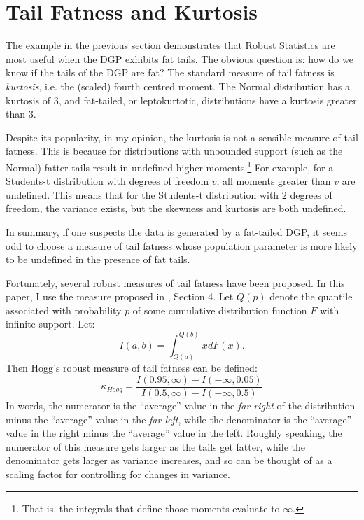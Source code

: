 \documentclass[12pt,a4paper]{amsart}
\renewcommand{\k}{\kappa}
\newcommand{\can}{\citeasnoun}							%
\begin{document}
\section{Tail Fatness and Kurtosis}\label{secTailFatness}

The example in the previous section demonstrates that Robust Statistics are most useful when the DGP exhibits fat tails. The obvious question is: how do we know if the tails of the DGP are fat? The standard measure of tail fatness is \emph{kurtosis}, i.e. the (scaled) fourth centred moment. The Normal distribution has a kurtosis of $3$, and fat-tailed, or leptokurtotic, distributions have a kurtosis greater than $3$.

Despite its popularity, in my opinion, the kurtosis is not a sensible measure of tail fatness. This is because for distributions with unbounded support (such as the Normal) fatter tails result in undefined higher moments.\footnote{That is, the integrals that define those moments evaluate to $\infty$.} For example, for a Students-t distribution with degrees of freedom $v$, all moments greater than $v$ are undefined. This means that for the Students-t distribution with $2$ degrees of freedom, the variance exists, but the skewness and kurtosis are both undefined.

In summary, if one suspects the data is generated by a fat-tailed DGP, it seems odd to choose a measure of tail fatness whose population parameter is more likely to be undefined in the presence of fat tails.

Fortunately, several robust measures of tail fatness have been proposed. In this paper, I use the measure proposed in \can{Hogg_(1974)}, Section 4. Let $Q(p)$ denote the quantile associated with probability $p$ of some cumulative distribution function $F$ with infinite support. Let:
\begin{equation}
I(a, b) = \int_{Q(a)}^{Q(b)} x dF(x) .
\end{equation}
Then Hogg's robust measure of tail fatness can be defined:
\begin{equation}
\k_{Hogg} = \frac{I(0.95, \infty) - I(-\infty, 0.05)}{I(0.5, \infty) - I(-\infty, 0.5)}
\end{equation}
In words, the numerator is the ``average'' value in the \emph{far right} of the distribution minus the ``average'' value in the \emph{far left}, while the denominator is the ``average'' value in the right minus the ``average'' value in the left. Roughly speaking, the numerator of this measure gets larger as the tails get fatter, while the denominator gets larger as variance increases, and so can be thought of as a scaling factor for controlling for changes in variance.
\end{document}
